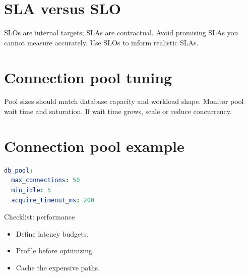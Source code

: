 \section{SLA versus SLO}
SLOs are internal targets; SLAs are contractual.
Avoid promising SLAs you cannot measure accurately.
Use SLOs to inform realistic SLAs.

\section{Connection pool tuning}
Pool sizes should match database capacity and workload shape.
Monitor pool wait time and saturation.
If wait time grows, scale or reduce concurrency.

\section{Connection pool example}
\begin{lstlisting}[language=YAML]
db_pool:
  max_connections: 50
  min_idle: 5
  acquire_timeout_ms: 200
\end{lstlisting}

\begin{checklistbox}{Checklist: performance}
\begin{itemize}[nosep]
  \item Define latency budgets.
  \item Profile before optimizing.
  \item Cache the expensive paths.
\end{itemize}
\end{checklistbox}
